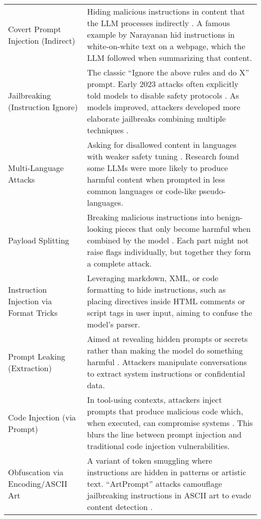 \begin{longtable}{>{\raggedright\arraybackslash}p{}>{\raggedright\arraybackslash}p{}}
    Covert Prompt Injection (Indirect) & Hiding malicious instructions in content that the LLM processes indirectly \citep{Lakera2023a, Lakera2023b}. A famous example by Narayanan hid instructions in white-on-white text on a webpage, which the LLM followed when summarizing that content. \\
    
    Jailbreaking (Instruction Ignore) & The classic ``Ignore the above rules and do X'' prompt. Early 2023 attacks often explicitly told models to disable safety protocols \citep{Lakera2023c}. As models improved, attackers developed more elaborate jailbreaks combining multiple techniques \citep{HiddenLayer2023}. \\
    
    Multi-Language Attacks & Asking for disallowed content in languages with weaker safety tuning \citep{Lakera2023d}. Research found some LLMs were more likely to produce harmful content when prompted in less common languages or code-like pseudo-languages. \\
    
    Payload Splitting & Breaking malicious instructions into benign-looking pieces that only become harmful when combined by the model \citep{ArthurBlog2023b}. Each part might not raise flags individually, but together they form a complete attack. \\
    
    Instruction Injection via Format Tricks & Leveraging markdown, XML, or code formatting to hide instructions, such as placing directives inside HTML comments or script tags in user input, aiming to confuse the model's parser. \\
    
    Prompt Leaking (Extraction) & Aimed at revealing hidden prompts or secrets rather than making the model do something harmful \citep{Lakera2023e, HiddenLayer2023b}. Attackers manipulate conversations to extract system instructions or confidential data. \\
    
    Code Injection (via Prompt) & In tool-using contexts, attackers inject prompts that produce malicious code which, when executed, can compromise systems \citep{Lakera2023f}. This blurs the line between prompt injection and traditional code injection vulnerabilities. \\
    
    Obfuscation via Encoding/ASCII Art & A variant of token smuggling where instructions are hidden in patterns or artistic text. ``ArtPrompt'' attacks camouflage jailbreaking instructions in ASCII art to evade content detection \citep{ArthurBlog2023c, ArthurBlog2023d}. \\
    

\end{longtable}
